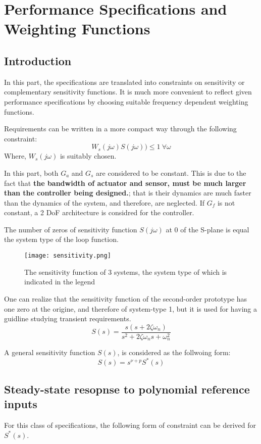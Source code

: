 \chapter{Performance Specifications and Weighting Functions}

\section{Introduction}
In this part, the specifications are translated into constraints on sensitivity or complementary sensitivity functions. It is much more convenient to reflect given performance specifications by choosing suitable frequency dependent weighting functions.

Requirements can be written in a more compact way through the following constraint:
\[
W_s(j\omega)S(j\omega)) \leq 1 \: \forall \omega
\]
Where, $W_s(j\omega)$ is suitably chosen.

\begin{factbox}
In this part, both $G_a$ and $G_s$ are considered to be constant. This is due to the fact that \textbf{the bandwidth of actuator and sensor, must be much larger than the controller being designed.}; that is their dynamics are much faster than the dynamics of the system, and therefore, are neglected. If $G_f$ is not constant, a 2 DoF architecture is considred for the controller.
\end{factbox}

\begin{QandAbox}[Important]
The number of zeros of sensitivity function $S(j\omega)$ at 0 of the S-plane is equal the system type of the loop function. 
\begin{figure}[H]
    \centering
    \texttt{[image: sensitivity.png]}
    \caption{The sensitivity function of 3 systems, the system type of which is indicated in the legend}
    \label{fig:sensitivity}
\end{figure}
One can realize that the sensitivity function of the second-order prototype has one zero at the origine, and therefore of system-type 1, but it is used for having a guidline studying transient requirements.
\[
S(s) = \frac{s(s+2\zeta\omega_n)}{s^2 + 2\zeta\omega_ns + \omega_n^2}
\]
\end{QandAbox}

A general sensitivity function $S(s)$, is considered as the follwoing form:\[
S(s) = s^{\nu + p}S^{*}(s)
\]
\newpage
\section{Steady-state resopnse to polynomial reference inputs}
For this class of specifications, the following form of constraint can be derived for $S^{*}(s)$.

